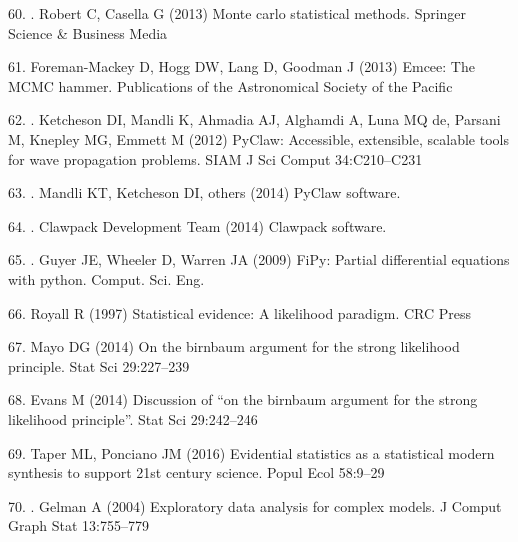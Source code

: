\documentclass[10pt,letterpaper]{article}
\providecommand{\DIFaddtex}[1]{{\protect\color{blue} \sf #1}} %
\providecommand{\DIFdeltex}[1]{{\protect\color{red} \scriptsize #1}} %
\providecommand{\DIFaddbegin}{} %
\providecommand{\DIFaddend}{} %
\providecommand{\DIFdelbegin}{} %
\providecommand{\DIFdelend}{} %
\providecommand{\DIFadd}[1]{\texorpdfstring{\DIFaddtex{#1}}{#1}} %
\providecommand{\DIFdel}[1]{\texorpdfstring{\DIFdeltex{#1}}{}} %
\begin{document}
\hypertarget{ref-Robert2013-gx}{}
\DIFdelbegin \DIFdel{60. }\DIFdelend \DIFaddbegin \DIFadd{53. }\DIFaddend Robert C, Casella G (2013) Monte carlo statistical methods. Springer
Science \& Business Media

\DIFdelbegin %
\DIFdel{61. Foreman-Mackey D, Hogg DW, Lang D, Goodman J (2013) Emcee: The MCMC
hammer. Publications of the Astronomical Society of the Pacific
}%

\DIFdelend \hypertarget{ref-Ketcheson2012-od}{}
\DIFdelbegin \DIFdel{62. }\DIFdelend \DIFaddbegin \DIFadd{54. }\DIFaddend Ketcheson DI, Mandli K, Ahmadia AJ, Alghamdi A, Luna MQ de, Parsani
M, Knepley MG, Emmett M (2012) PyClaw: Accessible, extensible, scalable
tools for wave propagation problems. SIAM J Sci Comput 34:C210--C231

\hypertarget{ref-Pyclaw2014-py}{}
\DIFdelbegin \DIFdel{63. }\DIFdelend \DIFaddbegin \DIFadd{55. }\DIFaddend Mandli KT, Ketcheson DI, others (2014) PyClaw software.

\hypertarget{ref-Clawpack2014-cs}{}
\DIFdelbegin \DIFdel{64. }\DIFdelend \DIFaddbegin \DIFadd{56. }\DIFaddend Clawpack Development Team (2014) Clawpack software.

\hypertarget{ref-Guyer2009-sq}{}
\DIFdelbegin \DIFdel{65. }\DIFdelend \DIFaddbegin \DIFadd{57. }\DIFaddend Guyer JE, Wheeler D, Warren JA (2009) FiPy: Partial differential
equations with python. Comput. Sci. Eng.

\DIFdelbegin %
\DIFdel{66. Royall R (1997) Statistical evidence: A likelihood paradigm. CRC
Press
}%

\DIFdel{67. Mayo DG (2014) On the birnbaum argument for the strong likelihood
principle. Stat Sci 29:227--239
}%

\DIFdel{68. Evans M (2014) Discussion of ``on the birnbaum argument for the
strong likelihood principle''. Stat Sci 29:242--246
}%

\DIFdel{69. Taper ML, Ponciano JM (2016) Evidential statistics as a statistical
modern synthesis to support 21st century science. Popul Ecol 58:9--29
}%

\DIFdelend \hypertarget{ref-Gelman2004-bk}{}
\DIFdelbegin \DIFdel{70. }\DIFdelend \DIFaddbegin \DIFadd{58. }\DIFaddend Gelman A (2004) Exploratory data analysis for complex models. J
Comput Graph Stat 13:755--779
\end{document}
